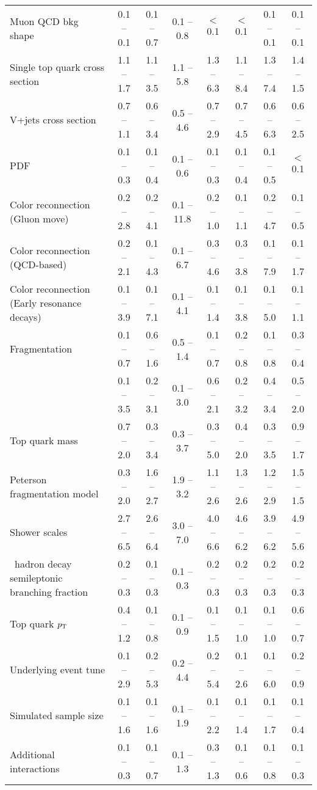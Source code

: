 \begin{landscape}
\begin{table}
{\begin{tabular}{lccccccc}
		Muon QCD bkg shape	&	0.1 -- 0.1	&	0.1 -- 0.7	&	0.1 -- 0.8	&	$<$0.1	&	$<$0.1	&	0.1 -- 0.1	&	0.1 -- 0.1\\ 
		Single top quark cross section	&	1.1 -- 1.7	&	1.1 -- 3.5	&	1.1 -- 5.8	&	1.3 -- 6.3	&	1.1 -- 8.4	&	1.3 -- 7.4	&	1.4 -- 1.5\\ 
		V+jets cross section	&	0.7 -- 1.1	&	0.6 -- 3.4	&	0.5 -- 4.6	&	0.7 -- 2.9	&	0.7 -- 4.5	&	0.6 -- 6.3	&	0.6 -- 2.5\\ 
		PDF 	&	0.1 -- 0.3	&	0.1 -- 0.4	&	0.1 -- 0.6	&	0.1 -- 0.3	&	0.1 -- 0.4	&	0.1 -- 0.5	&	$<$0.1\\ 
		Color reconnection (Gluon move)	&	0.2 -- 2.8	&	0.2 -- 4.1	&	0.1 -- 11.8	&	0.2 -- 1.0	&	0.1 -- 1.1	&	0.2 -- 4.7	&	0.1 -- 0.5\\ 
		Color reconnection (QCD-based)	&	0.2 -- 2.1	&	0.1 -- 4.3	&	0.1 -- 6.7	&	0.3 -- 4.6	&	0.3 -- 3.8	&	0.1 -- 7.9	&	0.1 -- 1.7\\ 
		Color reconnection (Early resonance decays)	&	0.1 -- 3.9	&	0.1 -- 7.1	&	0.1 -- 4.1	&	0.1 -- 1.4	&	0.1 -- 3.8	&	0.1 -- 5.0	&	0.1 -- 1.1\\ 
		Fragmentation	&	0.1 -- 0.7	&	0.6 -- 1.6	&	0.5 -- 1.4	&	0.1 -- 0.7	&	0.2 -- 0.8	&	0.1 -- 0.8	&	0.3 -- 0.4\\ 
		\hdamp{}	&	0.1 -- 3.5	&	0.2 -- 3.1	&	0.1 -- 3.0	&	0.6 -- 2.1	&	0.2 -- 3.2	&	0.4 -- 3.4	&	0.5 -- 2.0\\ 
		Top quark mass	&	0.7 -- 2.0	&	0.3 -- 3.4	&	0.3 -- 3.7	&	0.3 -- 5.0	&	0.4 -- 2.0	&	0.3 -- 3.5	&	0.9 -- 1.7\\ 
		Peterson fragmentation model	&	0.3 -- 2.0	&	1.6 -- 2.7	&	1.9 -- 3.2	&	1.1 -- 2.6	&	1.3 -- 2.6	&	1.2 -- 2.9	&	1.5 -- 1.5\\ 
		Shower scales	&	2.7 -- 6.5	&	2.6 -- 6.4	&	3.0 -- 7.0	&	4.0 -- 6.6	&	4.6 -- 6.2	&	3.9 -- 6.2	&	4.9 -- 5.6\\ 
		\bquark{}\ hadron decay semileptonic branching fraction	&	0.2 -- 0.3	&	0.1 -- 0.3	&	0.1 -- 0.3	&	0.2 -- 0.3	&	0.2 -- 0.3	&	0.2 -- 0.3	&	0.2 -- 0.3\\ 
		Top quark \ensuremath{\pt{}}	&	0.4 -- 1.2	&	0.1 -- 0.8	&	0.1 -- 0.9	&	0.1 -- 1.5	&	0.1 -- 1.0	&	0.1 -- 1.0	&	0.6 -- 0.7\\ 
		Underlying event tune	&	0.1 -- 2.9	&	0.2 -- 5.3	&	0.2 -- 4.4	&	0.2 -- 5.4	&	0.1 -- 2.6	&	0.1 -- 6.0	&	0.2 -- 0.9\\ 
		Simulated sample size	&	0.1 -- 1.6	&	0.1 -- 1.6	&	0.1 -- 1.9	&	0.1 -- 2.2	&	0.1 -- 1.4	&	0.1 -- 1.7	&	0.1 -- 0.4\\ 
		Additional interactions	&	0.1 -- 0.3	&	0.1 -- 0.7	&	0.1 -- 1.3	&	0.3 -- 1.3	&	0.1 -- 0.6	&	0.1 -- 0.8	&	0.1 -- 0.3\\ 

\end{tabular}}
\end{table}
\end{landscape}
